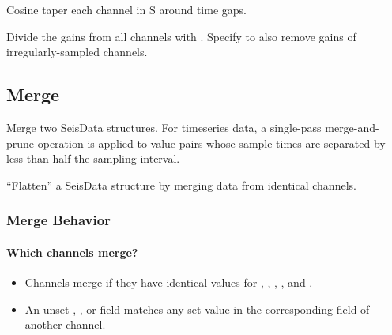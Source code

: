 \documentclass[letterpaper,11pt,english]{sphinxmanual}
\begin{document}
\begin{fulllineitems}
\end{fulllineitems}


Cosine taper each channel in S around time gaps.


\begin{fulllineitems}
\end{fulllineitems}


Divide the gains from all channels  with . Specify  to
also remove gains of irregularly-sampled channels.


\subsection{Merge}
\label{\detokenize{src/Processing/processing:merge}}\label{\detokenize{src/Processing/processing:id1}}

\begin{fulllineitems}
\end{fulllineitems}


Merge two SeisData structures. For timeseries data, a single-pass merge-and-prune
operation is applied to value pairs whose sample times are separated by less than
half the sampling interval.


\begin{fulllineitems}
\end{fulllineitems}


“Flatten” a SeisData structure by merging data from identical channels.


\subsubsection{Merge Behavior}
\label{\detokenize{src/Processing/processing:merge-behavior}}

\paragraph{Which channels merge?}
\label{\detokenize{src/Processing/processing:which-channels-merge}}\begin{itemize}
\item {} 
Channels merge if they have identical values for , , , , and .

\item {} 
An unset , , or  field matches any set value in the corresponding field of another channel.

\end{itemize}
\end{document}
